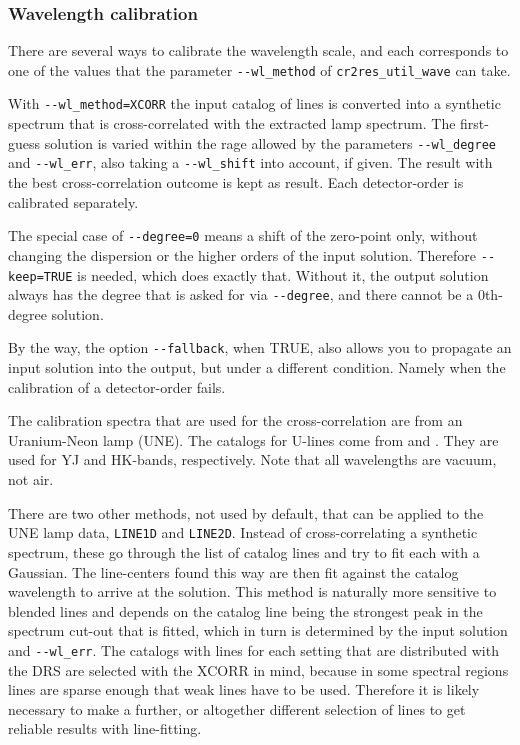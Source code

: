 \subsubsection{Wavelength calibration}

There are several ways to calibrate the wavelength scale, and each corresponds
to one of the values that the parameter \texttt{-{}-wl\_method} of
\texttt{cr2res\_util\_wave} can take.

With \texttt{-{}-wl\_method=XCORR} the input catalog of lines is converted
into a synthetic spectrum that is cross-correlated with the extracted lamp
spectrum. The first-guess solution is varied within the rage allowed by the parameters \verb!--wl_degree! and \verb!--wl_err!, also taking a \verb!--wl_shift! into account, if given. The result with the best cross-correlation outcome is kept as result.
Each detector-order is calibrated separately.

The special case of \verb!--degree=0! means a shift of the zero-point only, without changing the dispersion or the higher orders of the input solution. Therefore \verb!--keep=TRUE! is needed, which does exactly that. Without it, the output solution always has the degree that is asked for via \verb!--degree!, and there cannot be a $0$th-degree solution.

By the way, the option \verb!--fallback!, when TRUE, also allows you to propagate an input solution into the output, but under a different condition. Namely when the calibration of a detector-order fails.

The calibration spectra that are used for the cross-correlation are from an
Uranium-Neon lamp (UNE). The catalogs for U-lines come from
\cite{2018A&A...618A.118S} and \cite{2011ApJS..195...24R}. They are used for YJ
and HK-bands, respectively. Note that all wavelengths are vacuum, not air.

There are two other methods, not used by default, that can be applied to the UNE
lamp data, \verb!LINE1D! and \verb!LINE2D!. Instead of cross-correlating a
synthetic spectrum, these go through the list of catalog lines and try to fit
each with a Gaussian. The line-centers found this way are then fit against the
catalog wavelength to arrive at the solution. This method is naturally more
sensitive to blended lines and depends on the catalog line being the strongest
peak in the spectrum cut-out that is fitted, which in turn is determined by the
input solution and \verb!--wl_err!. The catalogs with lines for each setting
that are distributed with the DRS are selected with the XCORR in mind, because
in some spectral regions lines are sparse enough that weak lines have to be
used. Therefore it is likely necessary to make a further, or altogether
different selection of lines to get reliable results with line-fitting.

